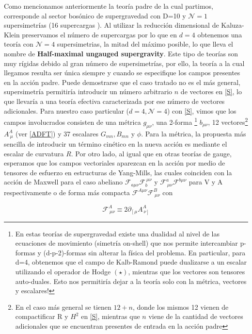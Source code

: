 \documentclass{article}
\numberwithin{equation}{section}
\begin{document}
Como mencionamos anteriormente la teoría padre de la cual partimos, corresponde al sector bosónico de supergravedad con D=10 y $ \mathcal{N}=1 $ supersimetrías (16 supercargas ). Al utilizar la reducción dimensional de Kaluza-Klein preservamos el número de supercargas por lo que en $ d=4 $ obtenemos una teoría con $ \mathcal{N}=4 $ supersimetrias, la mitad del máximo posible, lo que lleva el nombre de \textbf{Half-maximal ungauged supergravity}. Este tipo de teorías son muy rígidas debido al gran número de supersimetrías, por ello, la teoría a la cual llegamos resulta ser única siempre y cuando se especifique los campos presentes en la acción padre. Puede demostrarse que el caso tratado no es el más general, supersimetría permitiría introducir un número arbitrario $ n $ de vectores en \ref{S}, lo que llevaría a una teoría efectiva caracterizada por ese número de vectores adicionales. Para nuestro caso particular ($ d=4, \mathcal{N}=4 $) con \ref{S}, vimos que los campos involucrados consisten de una métrica $ g_{\mu \nu} $, una 2-forma
\footnote{En estas teorías de supergravedad existe una dualidad al nivel de las ecuaciones de movimiento (simetría on-shell) que nos permite intercambiar p-formas y (d-p-2)-formas sin alterar la física del problema. En particular, para d=4, obtenemos que el campo de Kalb-Ramond puede dualizarse a un escalar utilizando el operador de Hodge $ (\star) $, mientras que los vectores son tensores auto-duales. Esto nos permitiría dejar a la teoría solo con la métrica, vectores y escalares!}
$ b_{\mu \nu} $, 12 vectores\footnote{En el caso más general se tienen $ 12 + n $, donde los mismos 12 vienen de compactificar R y $ H^2 $ en \ref{S}, mientras que $ n $ viene de la cantidad de vectores adicionales que se encuentran presentes de entrada en la acción padre } 
$ A_{\ \mu}^A $ (ver \ref{ADFT}) y 37 escalares $ G_{m n}, B_{m n} $ y $ \phi $. Para la métrica, la propuesta más sencilla de introducir un término cinético en la nueva acción es mediante el escalar de curvatura $ R $. Por otro lado, al igual que en otras teorías de gauge, esperamos que los campos vectoriales aparezcan en la acción por medio de tensores de esfuerzo en estructuras de Yang-Mills, las cuales coinciden con la acción de Maxwell para el caso abeliano $ \mathcal{F}_{a \mu \nu} \mathcal{F}_b^{\ \mu \nu} $ y $ \mathcal{F}^a_{\ \mu \nu} \mathcal{F}^{b \mu \nu} $ para V y A respectivamente o de forma más compacta $ \mathcal{F}^{A \mu \nu} \mathcal{F}^B_{\ \mu \nu} $ con

\begin{equation}\label{F}
\mathcal{F}^A_{\ \mu \nu} \equiv 2 \partial_{\left[\mu\right.}A^A_{\ \left.\nu\right]}
\end{equation}
\end{document}
